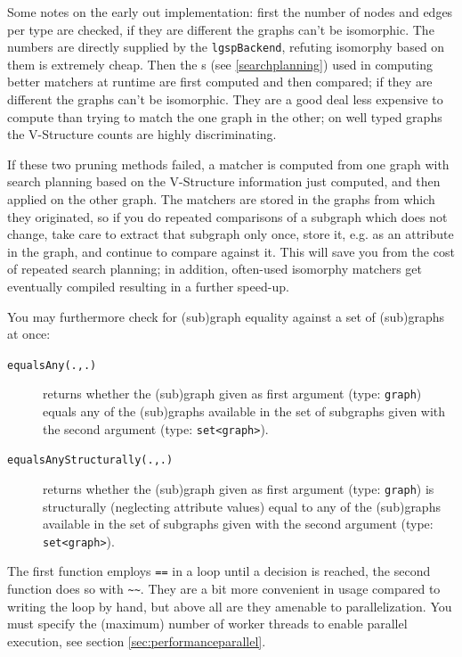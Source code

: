 Some notes on the early out implementation: first the number of nodes and edges per type are checked, if they are different the graphs can't be isomorphic. The numbers are directly supplied by the \texttt{lgspBackend}, refuting isomorphy based on them is extremely cheap.
Then the s (see \ref{searchplanning}) used in computing better matchers at runtime are first computed and then compared; if they are different the graphs can't be isomorphic. They are a good deal less expensive to compute than trying to match the one graph in the other; on well typed graphs the V-Structure counts are highly discriminating.

If these two pruning methods failed, a matcher is computed from one graph with search planning based on the V-Structure information just computed, and then applied on the other graph.
The matchers are stored in the graphs from which they originated, so if you do repeated comparisons of a subgraph which does not change, take care to extract that subgraph only once, store it, e.g. as an attribute in the graph, and continue to compare against it. 
This will save you from the cost of repeated search planning; in addition, often-used isomorphy matchers get eventually compiled resulting in a further speed-up.

\pagebreak %

You may furthermore check for (sub)graph equality against a set of (sub)graphs at once:

\begin{description}
\item[\texttt{equalsAny(.,.)}] returns whether the (sub)graph given as first argument (type: \texttt{graph}) equals any of the (sub)graphs available in the set of subgraphs given with the second argument (type: \texttt{set<graph>}).
\item[\texttt{equalsAnyStructurally(.,.)}] returns whether the (sub)graph given as first argument (type: \texttt{graph}) is structurally (neglecting attribute values) equal to any of the (sub)graphs available in the set of subgraphs given with the second argument (type: \texttt{set<graph>}).
\end{description}

The first function employs \verb#==# in a loop until a decision is reached, the second function does so with \verb#~~#.
They are a bit more convenient in usage compared to writing the loop by hand, but above all are they amenable to parallelization.
You must specify the (maximum) number of worker threads to enable parallel execution, see section \ref{sec:performanceparallel}.

